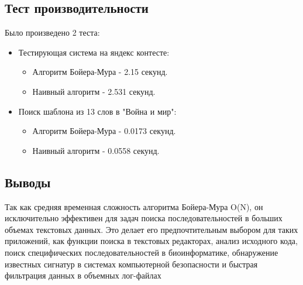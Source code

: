 \documentclass[12pt]{article}
\begin{document}
\subsection*{Тест производительности}
Было произведено 2 теста:
\begin{itemize}
    \item Тестирующая система на яндекс контесте:
    \begin{itemize}
        \item Алгоритм Бойера-Мура - 2.15 секунд.
        \item Наивный алгоритм - 2.531 секунд.
    \end{itemize}
    \item Поиск шаблона из 13 слов в "Война и мир":
    \begin{itemize}
        \item Алгоритм Бойера-Мура - 0.0173 секунд.
        \item Наивный алгоритм - 0.0558 секунд.
    \end{itemize}
\end{itemize}

\subsection*{Выводы}
Так как средняя временная сложность алгоритма Бойера-Мура O(N), он исключительно эффективен для задач поиска последовательностей в больших объемах текстовых данных. Это делает его предпочтительным выбором для таких приложений, как функции поиска в текстовых редакторах, анализ исходного кода, поиск специфических последовательностей в биоинформатике, обнаружение известных сигнатур в системах компьютерной безопасности и быстрая фильтрация данных в объемных лог-файлах
\end{document}
